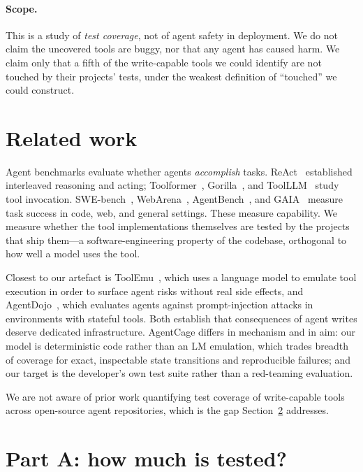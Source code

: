 \documentclass[11pt]{article}
\begin{document}
\paragraph{Scope.} This is a study of \emph{test coverage}, not of agent safety in
deployment. We do not claim the uncovered tools are buggy, nor that any agent has
caused harm. We claim only that a fifth of the write-capable tools we could identify
are not touched by their projects' tests, under the weakest definition of ``touched''
we could construct.

\section{Related work}

Agent benchmarks evaluate whether agents \emph{accomplish} tasks. ReAct~\cite{react}
established interleaved reasoning and acting; Toolformer~\cite{toolformer},
Gorilla~\cite{gorilla}, and ToolLLM~\cite{toolllm} study tool invocation.
SWE-bench~\cite{swebench}, WebArena~\cite{webarena}, AgentBench~\cite{agentbench}, and
GAIA~\cite{gaia} measure task success in code, web, and general settings. These measure
capability. We measure whether the tool implementations themselves are tested by the
projects that ship them---a software-engineering property of the codebase, orthogonal to
how well a model uses the tool.

Closest to our artefact is ToolEmu~\cite{toolemu}, which uses a language model to
emulate tool execution in order to surface agent risks without real side effects, and
AgentDojo~\cite{agentdojo}, which evaluates agents against prompt-injection attacks in
environments with stateful tools. Both establish that consequences of agent writes
deserve dedicated infrastructure. AgentCage differs in mechanism and in aim: our model
is deterministic code rather than an LM emulation, which trades breadth of coverage for
exact, inspectable state transitions and reproducible failures; and our target is the
developer's own test suite rather than a red-teaming evaluation.

We are not aware of prior work quantifying test coverage of write-capable tools across
open-source agent repositories, which is the gap Section~\ref{sec:parta} addresses.

\section{Part A: how much is tested?}
\label{sec:parta}
\end{document}
